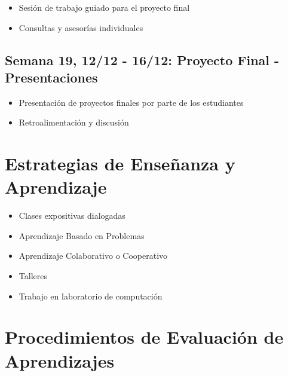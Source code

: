 \documentclass[11pt,letter,]{article}
\providecommand{\tightlist}{%
  \setlength{\itemsep}{0pt}\setlength{\parskip}{0pt}}
\begin{document}
\begin{itemize}
\tightlist
\item
  Sesión de trabajo guiado para el proyecto final
\item
  Consultas y asesorías individuales
\end{itemize}

\hypertarget{semana-19-1212---1612-proyecto-final---presentaciones}{%
\subsection{Semana 19, 12/12 - 16/12: Proyecto Final -
Presentaciones}\label{semana-19-1212---1612-proyecto-final---presentaciones}}

\begin{itemize}
\tightlist
\item
  Presentación de proyectos finales por parte de los estudiantes
\item
  Retroalimentación y discusión
\end{itemize}

\hypertarget{estrategias-de-enseuxf1anza-y-aprendizaje}{%
\section{Estrategias de Enseñanza y
Aprendizaje}\label{estrategias-de-enseuxf1anza-y-aprendizaje}}

\begin{itemize}
\tightlist
\item
  Clases expositivas dialogadas
\item
  Aprendizaje Basado en Problemas
\item
  Aprendizaje Colaborativo o Cooperativo
\item
  Talleres
\item
  Trabajo en laboratorio de computación
\end{itemize}

\hypertarget{procedimientos-de-evaluaciuxf3n-de-aprendizajes}{%
\section{Procedimientos de Evaluación de
Aprendizajes}\label{procedimientos-de-evaluaciuxf3n-de-aprendizajes}}
\end{document}
